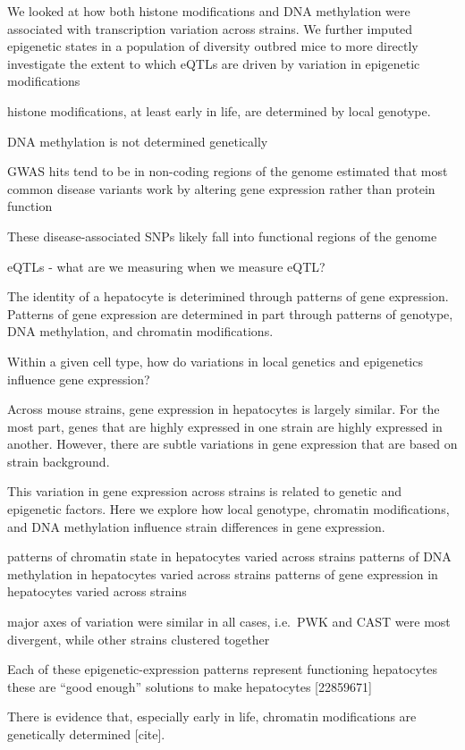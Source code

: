\documentclass[10pt,letterpaper]{article}
\begin{document}
We looked at how both histone modifications and DNA methylation were
associated with transcription variation across strains. We further
imputed epigenetic states in a population of diversity outbred mice to
more directly investigate the extent to which eQTLs are driven by
variation in epigenetic modifications

histone modifications, at least early in life, are determined by local
genotype.

DNA methylation is not determined genetically

GWAS hits tend to be in non-coding regions of the genome estimated that
most common disease variants work by altering gene expression rather
than protein function

These disease-associated SNPs likely fall into functional regions of the
genome

eQTLs - what are we measuring when we measure eQTL?

The identity of a hepatocyte is deterimined through patterns of gene
expression. Patterns of gene expression are determined in part through
patterns of genotype, DNA methylation, and chromatin modifications.

Within a given cell type, how do variations in local genetics and
epigenetics influence gene expression?

Across mouse strains, gene expression in hepatocytes is largely similar.
For the most part, genes that are highly expressed in one strain are
highly expressed in another. However, there are subtle variations in
gene expression that are based on strain background.

This variation in gene expression across strains is related to genetic
and epigenetic factors. Here we explore how local genotype, chromatin
modifications, and DNA methylation influence strain differences in gene
expression.

patterns of chromatin state in hepatocytes varied across strains
patterns of DNA methylation in hepatocytes varied across strains
patterns of gene expression in hepatocytes varied across strains

major axes of variation were similar in all cases, i.e.~PWK and CAST
were most divergent, while other strains clustered together

Each of these epigenetic-expression patterns represent functioning
hepatocytes these are ``good enough'' solutions to make hepatocytes
{[}22859671{]}

There is evidence that, especially early in life, chromatin
modifications are genetically determined {[}cite{]}.
\end{document}
